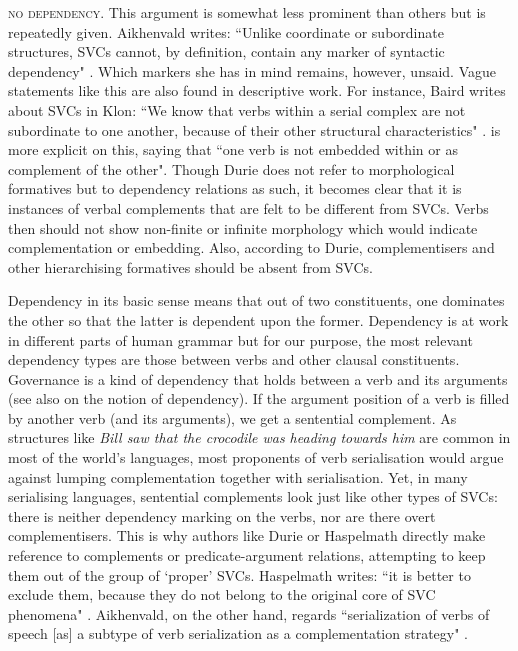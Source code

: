 \textsc{no dependency}. This argument is somewhat less prominent than others but is repeatedly given. Aikhenvald writes: ``Unlike coordinate or subordinate structures, SVCs cannot, by definition, contain any marker of syntactic dependency" \citep[20]{Aikhenvald2006}. Which markers she has in mind remains, however, unsaid. Vague statements like this are also found in descriptive work. For instance, Baird writes about SVCs in Klon: ``We know that verbs within a serial complex are not subordinate to one another, because of their other structural characteristics" \citep[136]{baird2008motion}. \citet[291]{Durie1997} is more explicit on this, saying that ``one verb is not embedded within or as complement of the other". Though Durie does not refer to morphological formatives but to dependency relations as such, it becomes clear that it is instances of verbal complements that are felt to be different from SVCs. Verbs then should not show non-finite or infinite morphology which would indicate complementation or embedding. Also, according to Durie, complementisers and other hierarchising formatives should be absent from SVCs. 

Dependency in its basic sense means that out of two constituents, one dominates the other so that the latter is dependent upon the former. Dependency is at work in different parts of human grammar but for our purpose, the most relevant dependency types are those between verbs and other clausal constituents. Governance is a kind of dependency that holds between a verb and its arguments (see also \citealt{bril2007nexus} on the notion of dependency). If the argument position of a verb is filled by another verb (and its arguments), we get a sentential complement. As structures like \textit{Bill saw that the crocodile was heading towards him} are common in most of the world's languages, most proponents of verb serialisation would argue against lumping complementation together with serialisation. Yet, in many serialising languages, sentential complements look just like other types of SVCs: there is neither dependency marking on the verbs, nor are there overt complementisers. This is why authors like Durie or Haspelmath directly make reference to complements or predicate-argument relations, attempting to keep them out of the group of `proper' SVCs. Haspelmath writes: ``it is better to exclude them, because they do not belong to the original core of SVC phenomena" \citep[15]{haspelmath2016serial}. Aikhenvald, on the other hand, regards ``serialization of verbs of speech [as] a subtype of verb serialization as a complementation strategy" \citep[25]{Aikhenvald2006}.   

